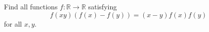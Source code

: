 Find all functions $f \colon \mathbb{R} \to \mathbb{R}$ satisfying
\[ f(xy)(f(x) - f(y)) = (x - y)f(x)f(y) \]
for all $x, y$.
